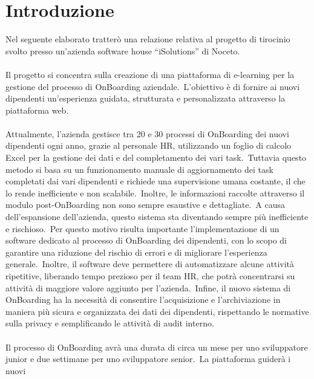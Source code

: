 \chapter*{Introduzione}\label{chapter:introduzione} %
Nel seguente elaborato tratterò una relazione relativa al progetto di tirocinio svolto 
presso un'azienda software house “iSolutions” di Noceto.
\\ \\
Il progetto si concentra sulla creazione di una piattaforma di e-learning per la 
gestione del processo di OnBoarding aziendale.\ L'obiettivo è di fornire ai nuovi 
dipendenti un'esperienza guidata, strutturata e personalizzata attraverso la 
piattaforma web. 
\\ \\
Attualmente, l'azienda gestisce tra 20 e 30 processi di OnBoarding dei nuovi 
dipendenti ogni anno, grazie al personale HR, utilizzando un foglio di calcolo Excel 
per la gestione dei dati e del completamento dei vari task.\ Tuttavia questo metodo si 
basa su un funzionamento manuale di aggiornamento dei task completati dai vari 
dipendenti e richiede una supervisione umana costante, il che lo rende inefficiente e 
non scalabile.\ Inoltre, le informazioni raccolte attraverso il modulo post-OnBoarding 
non sono sempre esaustive e dettagliate.\ A causa dell'espansione dell'azienda, 
questo sistema sta diventando sempre più inefficiente e rischioso.\ Per questo motivo 
risulta importante l'implementazione di un software dedicato al processo di 
OnBoarding dei dipendenti, con lo scopo di garantire una riduzione del rischio di 
errori e di migliorare l'esperienza generale.\ Inoltre, il software deve permettere di 
automatizzare alcune attività ripetitive, liberando tempo prezioso per il team HR, che 
potrà concentrarsi su attività di maggiore valore aggiunto per l'azienda.\ Infine, il 
nuovo sistema di OnBoarding ha la necessità di consentire l'acquisizione e 
l'archiviazione in maniera più sicura e organizzata dei dati dei dipendenti, 
rispettando le normative sulla privacy e semplificando le attività di audit interno.
\\ \\
Il processo di OnBoarding avrà una durata di circa un mese per uno sviluppatore 
junior e due settimane per uno sviluppatore senior.\ La piattaforma guiderà i nuovi 
